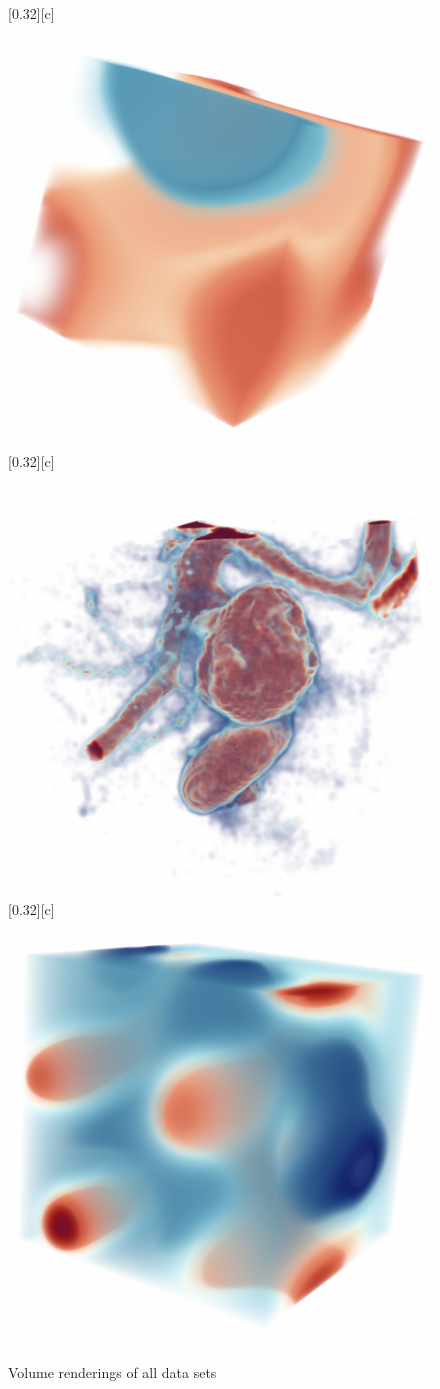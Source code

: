 \documentclass{article}
\begin{document}
\begin{figure}[htb]
        [0.32\linewidth][c]{%
                \includegraphics[width=0.2\linewidth]{img/supplementary/karfs.png}}
        [0.32\linewidth][c]{%
                \includegraphics[width=0.2\linewidth]{img/supplementary/aneurism.png}}
        [0.32\linewidth][c]{%
                \includegraphics[width=0.2\linewidth]{img/supplementary/velocityz.png}}
        \caption{Volume renderings of all data sets}
\end{figure}
\end{document}
